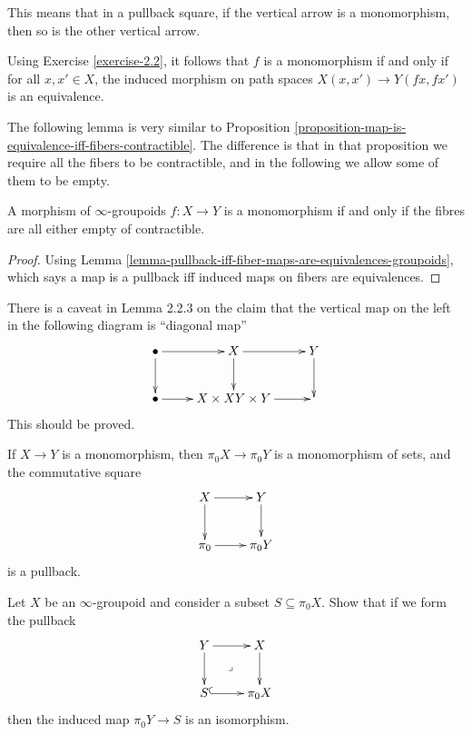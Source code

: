 This means that in a pullback square,
if the vertical arrow
is a monomorphism, then so is the
other vertical arrow.

\begin{remark}
\label{remark-monomorphism-equivalence}
Using Exercise \ref{exercise-2.2}, it follows that $f$ is a monomorphism
if and only if for all $x,x' \in X$, the induced
morphism on path spaces $X(x,x') \to Y(fx,fx')$ is
an equivalence.
\end{remark}

\noindent
The following lemma is very similar to
Proposition \ref{proposition-map-is-equivalence-iff-fibers-contractible}.
The difference is that in that proposition we
require all the fibers to be contractible,
and in the following we allow some of them to be empty.

\begin{lemma}
\label{lemma-monomorphism-iff-fibres-are-empty-or-contractible}
A morphism of $\infty$-groupoids $f:X \to Y$ is
a monomorphism if and only if the fibres are all
either empty of contractible.
\end{lemma}

\begin{proof}
Using Lemma \ref{lemma-pullback-iff-fiber-maps-are-equivalences-groupoids},
which says a map is a pullback iff induced maps on fibers are equivalences.
\end{proof}

\begin{remark}
\label{remark-lemma-2.2.3}
There is a caveat in Lemma 2.2.3 on the claim
that the vertical map on the left in the following
diagram is ``diagonal map''
$$
\xymatrix{
\bullet\ar[r]\ar[d]&X\ar[d]\ar[r]&Y\ar[d]\\
\bullet\ar[r]&X \times X\ar[r]Y \times Y&
}
$$
This should be proved.
\end{remark}

\begin{proposition}
\label{proposition-monomorphism-then-monomorophism-of-sets-and-pullback-square}
If $X \to Y$ is a monomorphism, then $\pi_0X \to \pi_0Y$ 
is a monomorphism of sets, and the commutative square
$$
\xymatrix{
X\ar[r]\ar[d]&Y\ar[d]\\
\pi_0\ar[r]&\pi_0Y
}
$$
is a pullback.
\end{proposition}

\begin{exercise}
\label{exercise-2.7}
Let $X$ be an $\infty$-groupoid and consider a subset $S\subseteq \pi_0X$.
Show that if we form the pullback
$$
\xymatrix{
Y\ar[r]\ar[d]\ar@{}[dr]|-{\lrcorner}&X\ar[d]\\
S\ar@{^{(}->}[r]&\pi_0X
}
$$
then the induced map $\pi_0Y\to S$ is an isomorphism.
\end{exercise}

